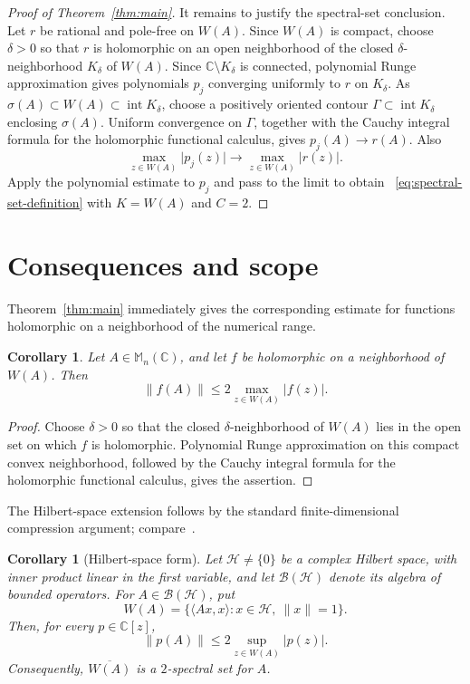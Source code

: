 \documentclass[preprints,article,submit,oneauthor]{Definitions/mdpi}
\newcounter{manuscriptresult}[section]
\theoremstyle{mdpi}
\newtheorem{corollary}[manuscriptresult]{Corollary}
\theoremstyle{definition}
\newcommand{\C}{\mathbb C}
\newcommand{\Mn}{\mathbb M_n(\C)}
\begin{document}
\begin{proof}[Proof of Theorem~\ref{thm:main}]
It remains to justify the spectral-set conclusion.  Let $r$ be
rational and pole-free on $W(A)$.  Since $W(A)$ is compact, choose
$\delta>0$ so that $r$ is holomorphic on an open neighborhood of the
closed $\delta$-neighborhood $K_\delta$ of $W(A)$.  Since
$\C\setminus K_\delta$ is connected, polynomial Runge approximation
gives polynomials $p_j$ converging uniformly to $r$ on $K_\delta$.  As
$\sigma(A)\subset W(A)\subset\operatorname{int}K_\delta$, choose a
positively oriented contour $\Gamma\subset\operatorname{int}K_\delta$
enclosing $\sigma(A)$.  Uniform convergence on $\Gamma$, together with
the Cauchy integral formula for the holomorphic functional calculus,
gives $p_j(A)\to r(A)$.  Also
\[
  \max_{z\in W(A)}\lvert p_j(z)\rvert
  \longrightarrow
  \max_{z\in W(A)}\lvert r(z)\rvert.
\]
Apply the polynomial estimate to $p_j$ and pass to the limit to obtain~%
\eqref{eq:spectral-set-definition} with $K=W(A)$ and $C=2$.
\end{proof}

\section{Consequences and scope}
\label{sec:consequences}

Theorem~\ref{thm:main} immediately gives the corresponding estimate for
functions holomorphic on a neighborhood of the numerical range.

\begin{corollary}
\label{cor:holomorphic-bound}
Let $A\in\Mn$, and let $f$ be holomorphic on a neighborhood of
$W(A)$.  Then
\begin{equation}
  \lVert f(A)\rVert
  \leq2\max_{z\in W(A)}\lvert f(z)\rvert.
  \label{eq:holomorphic-bound}
\end{equation}
\end{corollary}

\begin{proof}
Choose $\delta>0$ so that the closed $\delta$-neighborhood of $W(A)$
lies in the open set on which $f$ is holomorphic.  Polynomial Runge
approximation on this compact convex neighborhood, followed by the
Cauchy integral formula for the holomorphic functional calculus, gives
the assertion.
\end{proof}

The Hilbert-space extension follows by the standard finite-dimensional
compression argument; compare~\cite{BickelEtAl2020}.

\begin{corollary}[Hilbert-space form]
\label{cor:operator-bound}
Let $\mathcal H\neq\{0\}$ be a complex Hilbert space, with inner
product linear in the first variable, and let $\mathcal B(\mathcal H)$
denote its algebra of bounded operators.  For
$A\in\mathcal B(\mathcal H)$, put
\[
  W(A)=\{\langle Ax,x\rangle:x\in\mathcal H,\ \lVert x\rVert=1\}.
\]
Then, for every $p\in\C[z]$,
\begin{equation}
  \lVert p(A)\rVert
  \leq 2\sup_{z\in W(A)}\lvert p(z)\rvert.
  \label{eq:operator-polynomial-bound}
\end{equation}
Consequently, $\overline{W(A)}$ is a $2$-spectral set for $A$.
\end{corollary}
\end{document}
